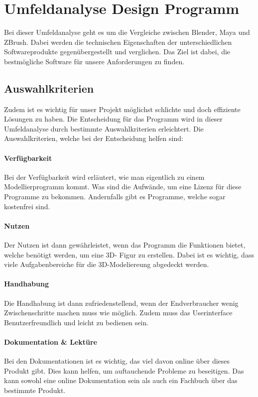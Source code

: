 \pagebreak

\section{Umfeldanalyse Design Programm}
Bei dieser Umfeldanalyse geht es um die Vergleiche zwischen Blender, Maya und ZBrush. Dabei werden die technischen Eigenschaften der unterschiedlichen Softwareprodukte gegenübergestellt und verglichen. Das Ziel ist dabei, die bestmögliche Software für unsere Anforderungen zu finden.

\subsection{Auswahlkriterien}
Zudem ist es wichtig für unser Projekt möglichst schlichte und doch effiziente Lösungen zu haben. Die Entscheidung für das Programm wird in dieser Umfeldanalyse durch bestimmte Auswahlkriterien erleichtert. Die Auswahlkriterien, welche bei der Entscheidung helfen sind: 

\paragraph{Verfügbarkeit}
Bei der Verfügbarkeit wird erläutert, wie man eigentlich zu einem Modellierprogramm kommt. Was sind die Aufwände, um eine Lizenz für diese Programme zu bekommen. Andernfalls gibt es Programme, welche sogar kostenfrei sind.

\paragraph{Nutzen}
Der Nutzen ist dann gewährleistet, wenn das Programm die Funktionen bietet, welche benötigt werden, um eine 3D- Figur zu erstellen. Dabei ist es wichtig, dass viele Aufgabenbereiche für die 3D-Modeliereung abgedeckt werden.

\paragraph{Handhabung}
Die Handhabung ist dann zufriedenstellend, wenn der Endverbraucher wenig Zwischenschritte machen muss wie möglich. Zudem muss das Userinterface Benutzerfreundlich und leicht zu bedienen sein.

\paragraph{Dokumentation \& Lektüre}
Bei den Dokumentationen ist es wichtig, das viel davon online über dieses Produkt gibt. Dies kann helfen, um auftauchende Probleme zu beseitigen. Das kann sowohl eine online Dokumentation sein als auch ein Fachbuch über das bestimmte Produkt.

